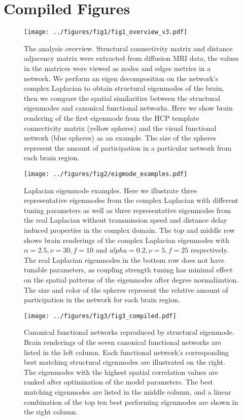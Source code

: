 \documentclass{article}
\begin{document}
\section{Compiled Figures}

\begin{figure}[ht]
  \centering
  \texttt{[image: ../figures/fig1/fig1\_overview\_v3.pdf]}
  \caption{The analysis overview. Structural connectivity matrix and distance adjacency matrix were extracted from diffusion MRI data, the values in the matrices were viewed as nodes and edges metrics in a network. We perform an eigen decomposition on the network's complex Laplacian to obtain structural eigenmodes of the brain, then we compare the spatial similarities between the structural eigenmodes and canonical functional networks. Here we show brain rendering of the first eigenmode from the HCP template connectivity matrix (yellow spheres) and the visual functional network (blue spheres) as an example. The size of the spheres represent the amount of participation in a particular network from each brain region.}
  \label{fig:fig1}
\end{figure}

\begin{figure}[ht]
 \centering
 \texttt{[image: ../figures/fig2/eigmode\_examples.pdf]}
 \caption{Laplacian eigenmode examples. Here we illustrate three representative eigenmodes from the complex Laplacian with different tuning parameters as well as three representative eigenmodes from the real Laplacian without transmission speed and distance delay induced properties in the complex domain. The top and middle row shows brain renderings of the complex Laplacian eigenmodes with {$\alpha = 2.5, \nu = 30, f = 10$} and {$alpha = 0.2, \nu = 5, f = 25$} respectively. The real Laplacian eigenmodes in the bottom row does not have tunable parameters, as coupling strength tuning has minimal effect on the spatial patterns of the eigenmodes after degree normalization. The size and color of the spheres represent the relative amount of participation in the network for each brain region.}
 \label{fig:fig2}
\end{figure}

\begin{figure}[ht]
 \centering
 \texttt{[image: ../figures/fig3/fig3\_compiled.pdf]}
 \caption{Canonical functional networks reproduced by structural eigenmode. Brain renderings of the seven canonical functional networks are listed in the left column. Each functional network's corresponding best matching structural eigenmodes are illustrated on the right. The eigenmodes with the highest spatial correlation values are ranked after optimization of the model parameters. The best matching eigenmodes are listed in the middle column, and a linear combination of the top ten best performing eigenmodes are shown in the right column.}
 \label{fig:fig3}
\end{figure}
\end{document}

